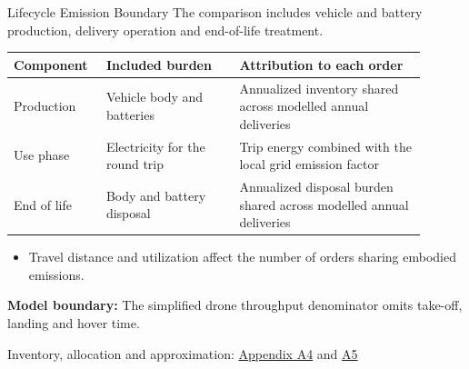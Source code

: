\documentclass[9pt]{beamer}
\begin{document}
\begin{frame}{Lifecycle Emission Boundary}
\small
The comparison includes vehicle and battery production, delivery operation and end-of-life treatment.
\vspace{0.4em}
\begin{center}
\renewcommand{\arraystretch}{1.35}
\begin{tabular}{@{}p{0.18\linewidth}p{0.30\linewidth}p{0.42\linewidth}@{}}
\toprule Component & Included burden & Attribution to each order\\\midrule
Production & Vehicle body and batteries & Annualized inventory shared across modelled annual deliveries\\
Use phase & Electricity for the round trip & Trip energy combined with the local grid emission factor\\
End of life & Body and battery disposal & Annualized disposal burden shared across modelled annual deliveries\\
\bottomrule
\end{tabular}
\end{center}
\begin{itemize}
\item Travel distance and utilization affect the number of orders sharing embodied emissions.
\end{itemize}
\par\footnotesize\textbf{Model boundary:} The simplified drone throughput denominator omits take-off, landing and hover time.
\vspace{0.4em}
\par\scriptsize\color{gray} Inventory, allocation and approximation: \hyperlink{app:emission:4}{Appendix A4} and \hyperlink{app:emission:5}{A5}
\end{frame}
\end{document}
